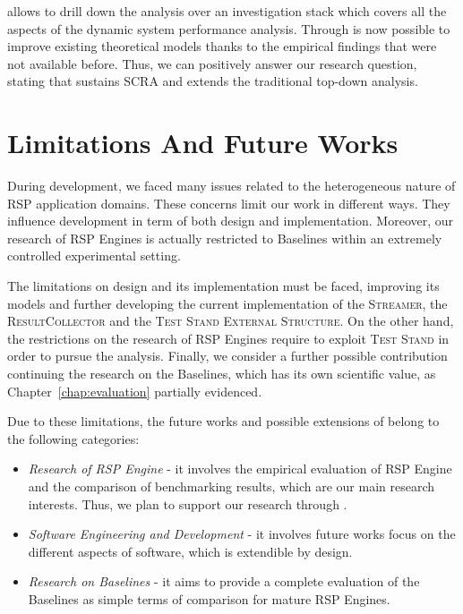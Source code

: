 
\name allows to drill down the analysis over an investigation stack which covers all the aspects of the dynamic system performance analysis. Through \name is now possible to improve existing theoretical models thanks to the empirical findings that were not available before. Thus, we can positively answer our research question, stating that \name sustains SCRA and extends the traditional top-down analysis. 

\section{Limitations And Future Works}\label{sec:research-fw-conclusion}

During \name development, we faced many issues related to the heterogeneous nature of RSP application domains. These concerns limit our work in different ways. They influence \name development in term of both design and implementation. Moreover, our research of RSP Engines  is actually restricted to \name Baselines within an extremely controlled experimental setting.

The limitations on \name design and its implementation must be faced, improving its models and further developing the current implementation of the \textsc{Streamer}, the \textsc{ResultCollector} and the \textsc{Test Stand External Structure}. On the other hand, the restrictions on the research of RSP Engines require to exploit \name \textsc{Test Stand} in order to pursue the analysis. Finally, we consider a further possible contribution continuing the research on the Baselines, which has its own scientific value, as Chapter~\ref{chap:evaluation} partially evidenced.

Due to these limitations, the future works and possible extensions of \name belong to the following categories:
\begin{itemize}
\item \textit{Research of RSP Engine} - it involves the empirical evaluation of RSP Engine and the comparison of benchmarking results, which are our main research interests. Thus, we plan to support our research through \namens.
\item \textit{Software Engineering and Development} - it involves future works focus on the different aspects of \name software, which is extendible by design.
\item \textit{Research on Baselines} - it aims to provide a complete evaluation of the Baselines as simple terms of comparison for mature RSP Engines.
\end{itemize}

